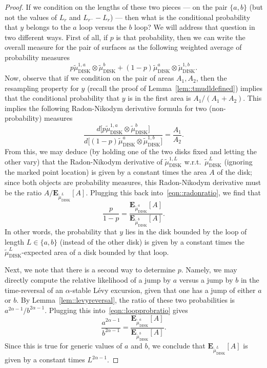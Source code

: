 \documentclass[10pt]{amsart}
\theoremstyle{plain}
\numberwithin{theorem}{section}
\theoremstyle{definition}
\newcommand \E {{\mathbf E}}
\newcommand{\tmudonel}{\wt{\mu}_{ \mathrm{DISK}}^{1, L}}
\newcommand{\tmudl}{\wt{\mu}_{\mathrm{DISK}}^L}
\def\tmudlset#1{\wt{\mu}_{\mathrm{DISK}}^{#1}}
\def\tmudonelset#1{\wt{\mu}_{ \mathrm{DISK}}^{1, #1}}
\let\wt\widetilde
\begin{document}
\begin{proof}
If we condition on the lengths of these two pieces --- \ie on the pair $\{a,b\}$ (but not the values of $L_r$ and $L_{r^-} - L_r$) --- then what is the conditional probability that $y$ belongs to the $a$ loop versus the $b$ loop? We will address that question in two different ways. First of all, if $p$ is that probability, then we can write the overall measure for the pair of surfaces as the following weighted average of probability measures
\[
p \tmudonelset{a} \otimes \tmudlset{b} + (1-p) \tmudlset{a} \otimes \tmudonelset{b}.
\]
Now, observe that if we condition on the pair of areas $A_1, A_2$, then the resampling property for $y$ (recall the proof of Lemma~\ref{lem::tmudldefined}) implies that the conditional probability that $y$ is in the first area is $A_1/(A_1 + A_2)$. This implies the following Radon-Nikodym derivative formula for two (non-probability) measures
\begin{equation}
\label{eqn::radonratio}
\frac{ d \bigl[ p \tmudonelset{a} \otimes \tmudlset{b} \bigr] }{d \bigl[(1-p) \tmudlset{a} \otimes \tmudonelset{b} \bigr]} = \frac{A_1}{A_2}.
\end{equation}
From this, we may deduce (by holding one of the two disks fixed and letting the other vary) that the Radon-Nikodym derivative of $\tmudonel$ w.r.t.\ $\tmudl$ (ignoring the marked point location) is given by a constant times the area $A$ of the disk; since both objects are probability measures, this Radon-Nikodym derivative must be the ratio $A/\E_{\tmudl}[ A]$. Plugging this back into~\eqref{eqn::radonratio}, we find that
\begin{equation}
\label{eqn::loopprobratio}
\frac{p}{1-p} = \frac{\E_{\tmudlset{a}} [A]}{\E_{\tmudlset{b}} [A]}.
\end{equation}
In other words, the probability that $y$ lies in the disk bounded by the loop of length $L \in \{a,b\}$ (instead of the other disk) is given by a constant times the $\tmudl$-expected area of a disk bounded by that loop.

Next, we note that there is a second way to determine $p$. Namely, we may directly compute the relative likelihood of a jump by $a$ versus a jump by $b$ in the time-reversal of an $\alpha$-stable Lévy excursion, given that one has a jump of either $a$ or $b$. By Lemma~\ref{lem::levyreversal}, the ratio of these two probabilities is $a^{2\alpha-1}/b^{2\alpha-1}.$ Plugging this into~\eqref{eqn::loopprobratio} gives
\[
\frac{a^{2\alpha-1}}{b^{2\alpha-1}} = \frac{\E_{\tmudlset{a}} [A]}{\E_{\tmudlset{b}} [A]}.
\]
Since this is true for generic values of $a$ and $b$, we conclude that $\E_{\tmudl}[A]$ is given by a constant times $L^{2\alpha - 1}$.
\end{proof}
\end{document}
